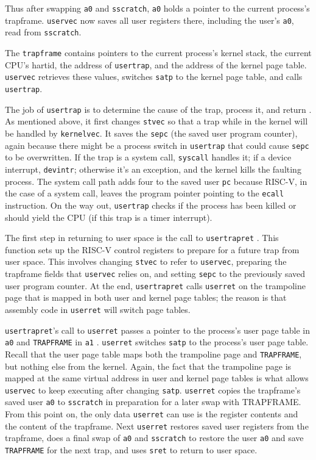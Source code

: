 Thus after swapping {\tt a0} and {\tt sscratch}, {\tt a0}
holds a pointer to the current process's trapframe.
{\tt uservec} now saves all user registers there,
including the user's {\tt a0}, read from {\tt sscratch}.

The {\tt trapframe} contains pointers to the current process's
kernel stack, the current CPU's hartid, the address of {\tt usertrap},
and the address of the kernel page table. {\tt uservec}
retrieves these values, switches {\tt satp} to the kernel page table,
and calls {\tt usertrap}.

The job of {\tt usertrap} is to determine
the cause of the trap, process it, and return
.
As mentioned above, it first changes {\tt stvec} so
that a trap while in the kernel will be handled by
{\tt kernelvec}.
It saves the {\tt sepc} (the saved user program counter),
again because there might be a
process switch in {\tt usertrap} that could cause {\tt sepc}
to be overwritten.
If the trap is a system call, {\tt syscall} handles it;
if a device interrupt, {\tt devintr};
otherwise it's an exception, and the kernel kills the
faulting process.
The system call path adds four to the saved user {\tt pc}
because RISC-V, in the case of a system call,
leaves the program pointer pointing to the {\tt ecall} instruction.
On the way out, {\tt usertrap} checks if the process has been
killed or should yield the CPU (if this trap is a timer interrupt).

The first step in returning to user space is the call to {\tt usertrapret}
.
This function sets up the RISC-V control registers to prepare for a
future trap from user space. This involves changing {\tt stvec}
to refer to {\tt uservec}, preparing the trapframe fields that
{\tt uservec} relies on, and setting {\tt sepc} to the previously
saved user program counter. At the end, {\tt usertrapret}
calls {\tt userret} on the trampoline page that is mapped in
both user and kernel page tables; the reason is that assembly
code in {\tt userret} will switch page tables.

{\tt usertrapret}'s call to {\tt userret} passes a pointer to the process's user
page table in {\tt a0} and {\tt TRAPFRAME} in {\tt a1}
.
{\tt userret} switches {\tt satp} to the process's user page table.
Recall that the user page table maps both the trampoline page
and {\tt TRAPFRAME}, but nothing else from the kernel.
Again, the fact that the trampoline page is mapped at the same
virtual address in user and kernel page tables is what allows
{\tt uservec} to keep executing after changing {\tt satp}.
{\tt userret} copies the trapframe's saved user {\tt a0} to {\tt sscratch}
in preparation for a later swap with TRAPFRAME.
From this point on, the only data {\tt userret} can use is
the register contents and the content of the trapframe.
Next {\tt userret} restores saved user registers from the trapframe,
does a final swap of {\tt a0} and {\tt sscratch} to restore the
user {\tt a0} and save {\tt TRAPFRAME} for the next trap,
and uses {\tt sret} to return to user space.

